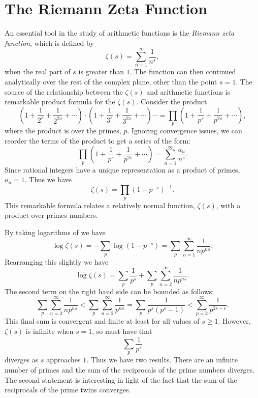 \section{The Riemann Zeta Function}
\label{RiemannZeta:Sec}

An essential tool in the study of arithmetic functions is the {\em Riemann
zeta function}, which is defined by 
\[
\zeta(s) = \sum_{n=1}^{\infty} \frac{1}{n^s},
\]
when the real part of $s$ is greater than $1$.  The function can then
continued analytically over the rest of the complex plane, other than
the point $s = 1$.
The source of the relationship between the $\zeta(s)$ and arithmetic
functions is remarkable product formula for the $\zeta(s)$.  Consider
the product
\[
\left(1 + \frac{1}{2^s} + \frac{1}{2^{2s}} + \cdots \right) \cdot
\left(1 + \frac{1}{3^s} + \frac{1}{3^{2s}} + \cdots \right) \cdots
=
\prod_p \left(1 + \frac{1}{p^s} + \frac{1}{p^{2s}} + \cdots \right),
\]
where the product is over the primes, $p$.  Ignoring convergence
issues, we can reorder the terms of the product to get a series of the
form:
\[
\prod_p \left(1 + \frac{1}{p^s} + \frac{1}{p^{2s}} + \cdots \right)
 = \sum_{n=1}^{\infty} \frac{a_n}{n^s}.
\]
Since rational integers have a unique representation as a product of
primes, $a_n = 1$.  Thus we have
\begin{equation}\label{ZetaProduct:Eq}
\zeta(s) = \prod_p \left(1 - p^{-s}\right)^{-1}.
\end{equation}
This remarkable formula relates a relatively normal function,
$\zeta(s)$, with a product over primes numbers.

By taking logarithms of  we have
\[
\log \zeta(s) = - \sum_p \log (1 - p^{-s}) 
  = \sum_p \sum_{n=1}^{\infty}\frac{1}{n p^{ns}}.
\]
Rearranging this slightly we have
\[
\log \zeta(s) = \sum_p \frac{1}{p^s} + \sum_p \sum_{n=2}^{\infty}
\frac{1}{n p^{ns}}.
\]
The second term on the right hand side can be bounded as follows:
\[
\sum_p \sum_{n=2}^{\infty} \frac{1}{n p^{ns}}
 < \sum_p \sum_{n=2}^{\infty} \frac{1}{p^{ns}} = \sum_p
\frac{1}{p^s(p^s-1)} 
< \sum_{p=2}^{\infty} \frac{1}{p^{2s-\epsilon}}.
\]
This final sum is convergent and finite at least for all values of $s
\ge 1$.  However, $\zeta(s)$ is 
infinite when $s=1$, so must have that 
\[
\sum_p \frac{1}{p^s}
\]
diverges as $s$ approaches $1$.  Thus we have two results.  There are
an infinite number of primes and the sum of the reciprocals of the
prime numbers diverges.  The second statement is interesting in light
of the fact that the sum of the reciprocals of the prime twins converges.

